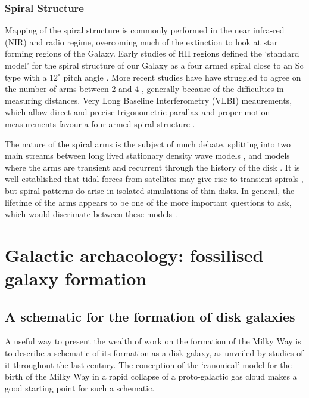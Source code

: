 \subsubsection{Spiral Structure}
Mapping of the spiral structure is commonly performed in the near infra-red (NIR) and radio regime, overcoming much of the extinction to look at star forming regions of the Galaxy. Early studies of HII regions defined the `standard model' for the spiral structure of our Galaxy as a four armed spiral close to an Sc type with a $12^{\circ}$ pitch angle  \citep{1976A&A....49...57G}. More recent studies have have struggled to agree on the number of arms between 2 and 4 \citep[e.g.][]{1976A&A....46..261S,1980ApJ...239L..53C,1981ApJ...250..551B,1995ApJ...454..119V,2000A&A...358L..13D,2003A&A...397..133R}, generally because of the difficulties in measuring distances. Very Long Baseline Interferometry (VLBI) meaurements, which allow direct and precise trigonometric parallax and proper motion measurements favour a four armed spiral structure \citep{2009ApJ...700..137R,2014ApJ...783..130R}.

The nature of the spiral arms is the subject of much debate, splitting into two main streams between long lived stationary density wave models \citep[e.g.][]{1964ApJ...140..646L,1996ssgd.book.....B}, and models where the arms are transient and recurrent through the history of the disk \citep[e.g.][]{1981seng.proc..111T,1984ApJ...282...61S}. It is well established that tidal forces from satellites may give rise to transient spirals \citep{2010MNRAS.403..625D}, but spiral patterns do arise in isolated simulations of thin disks.  In general, the lifetime of the arms appears to be one of the more important questions to ask, which would discrimate between these models \citep{2011MNRAS.410.1637S}.


\section{Galactic archaeology: fossilised galaxy formation}

\subsection{A schematic for the formation of disk galaxies}

A useful way to present the wealth of work on the formation of the Milky Way is to describe a schematic of its formation as a disk galaxy, as unveiled by studies of it throughout the last century. The conception of the `canonical' model for the birth of the Milky Way in a rapid collapse of a proto-galactic gas cloud \citep[the ELS model;][]{1962ApJ...136..748E} makes a good starting point for such a schematic. 

